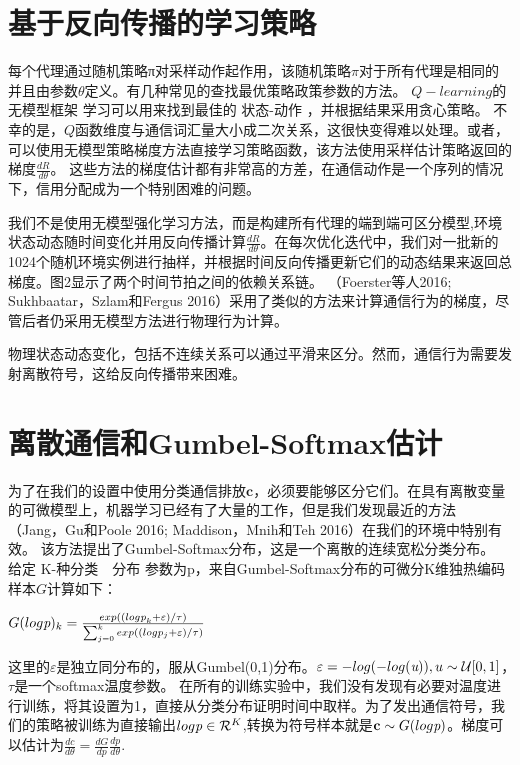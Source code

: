 \section{基于反向传播的学习策略}
每个代理通过随机策略π对采样动作起作用，该随机策略$\pi$对于所有代理是相同的并且由参数$\theta$定义。有几种常见的查找最优策略政策参数的方法。 $Q-learning$的无模型框架
学习可以用来找到最佳的 状态-动作 ，并根据结果采用贪心策略。 不幸的是，$Q$函数维度与通信词汇量大小成二次关系，这很快变得难以处理。或者，可以使用无模型策略梯度方法直接学习策略函数，该方法使用采样估计策略返回的梯度$\frac{dR}{d\theta}$。 这些方法的梯度估计都有非常高的方差，在通信动作是一个序列的情况下，信用分配成为一个特别困难的问题。
\par 
我们不是使用无模型强化学习方法，而是构建所有代理的端到端可区分模型,环境状态动态随时间变化并用反向传播计算$\frac{dR}{d\theta}$。在每次优化迭代中，我们对一批新的1024个随机环境实例进行抽样，并根据时间反向传播更新它们的动态结果来返回总梯度。图2显示了两个时间节拍之间的依赖关系链。 （Foerster等人2016; Sukhbaatar，Szlam和Fergus 2016）采用了类似的方法来计算通信行为的梯度，尽管后者仍采用无模型方法进行物理行为计算。
\par 
物理状态动态变化，包括不连续关系可以通过平滑来区分。然而，通信行为需要发射离散符号，这给反向传播带来困难。


\section{离散通信和Gumbel-Softmax估计}
为了在我们的设置中使用分类通信排放$\textbf{c}$，必须要能够区分它们。在具有离散变量的可微模型上，机器学习已经有了大量的工作，但是我们发现最近的方法（Jang，Gu和Poole 2016;
Maddison，Mnih和Teh 2016）在我们的环境中特别有效。
该方法提出了Gumbel-Softmax分布，这是一个离散的连续宽松分类分布。 给定 K-种分类　分布
参数为p，来自Gumbel-Softmax分布的可微分K维独热编码样本$G$计算如下：
\par 
$G(log\emph{p})_k = \frac{exp((log\emph{p}_k + \varepsilon) / \tau)}{\sum_{j=0}^k\large exp((logp_j + \varepsilon)/ \tau)}$
\par 
这里的$\varepsilon$是独立同分布的，服从Gumbel(0,1)分布。$\varepsilon = -log(-log(\emph{u})), u \sim \mathcal{U}[0,1]$，　$\tau$是一个softmax温度参数。
在所有的训练实验中，我们没有发现有必要对温度进行训练，将其设置为1，直接从分类分布证明时间中取样。为了发出通信符号，我们的策略被训练为直接输出$log\emph{p} \in \mathcal{R}^K$,转换为符号样本就是$\mathbf{c} \sim G(log\emph{p})$。梯度可以估计为$\frac{dc}{d\theta} = \frac{dG}{dp}\frac{dp}{d\theta}$.



